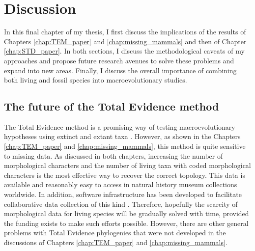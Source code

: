 \chapter{Discussion}
\label{chap:discussion}

%
%

In this final chapter of my thesis, I first discuss the implications of the results of Chapters \ref{chap:TEM_paper} and \ref{chap:missing_mammals} and then of Chapter \ref{chap:STD_paper}.
In both sections, I discuss the methodological caveats of my approaches and propose future research avenues to solve these problems and expand into new areas.
Finally, I discuss the overall importance of combining both living and fossil species into macroevolutionary studies.

\section{The future of the Total Evidence method}
The Total Evidence method is a promising way of testing macroevolutionary hypotheses using extinct and extant taxa \citep[e.g.][]{ronquista2012,Slater2012MEE,Wood01032013,beckancient2014,Dembo2015}.
However, as shown in the Chapters \ref{chap:TEM_paper} and \ref{chap:missing_mammals}, this method is quite sensitive to missing data.
As discussed in both chapters, increasing the number of morphological characters and the number of living taxa with coded morphological characters is the most effective way to recover the correct topology.
This data is available and reasonably easy to access in natural history museum collections worldwide. 
In addition, software infrastructure has been developed to facilitate collaborative data collection of this kind \citep[\textit{MorphoBank};][]{morphobank}.
Therefore, hopefully the scarcity of morphological data for living species will be gradually solved with time, provided the funding exists to make such efforts possible.
However, there are other general problems with Total Evidence phylogenies that were not developed in the discussions of Chapters \ref{chap:TEM_paper} and \ref{chap:missing_mammals}. 

